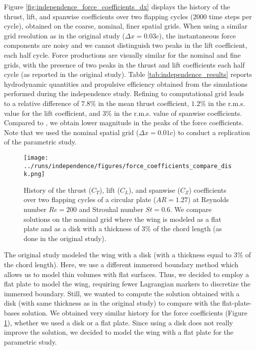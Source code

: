 Figure \ref{fig:independence_force_coefficients_dx} displays the history of the thrust, lift, and spanwise coefficients over two flapping cycles ($2000$ time steps per cycle), obtained on the coarse, nominal, finer spatial grids.
When using a similar grid resolution as in the original study ($\Delta x = 0.03c$), the instantaneous force components are noisy and we cannot distinguish two peaks in the lift coefficient, each half cycle.
Force productions are visually similar for the nominal and fine grids, with the presence of two peaks in the thrust and lift coefficients each half cycle (as reported in the original study).
Table \ref{tab:independence_results} reports hydrodynamic quantities and propulsive efficiency obtained from the simulations performed during the independence study.
Refining to computational grid leads to a relative difference of $7.8\%$ in the mean thrust coefficient, $1.2\%$ in the r.m.s. value for the lift coefficient, and $3\%$ in the r.m.s. value of spanwise coefficients.
Compared to \citet{li_dong_2016}, we obtain lower magnitude in the peaks of the force coefficients.
Note that we used the nominal spatial grid ($\Delta x = 0.01c$) to conduct a replication of the parametric study.

\begin{figure}
  \centering
  \texttt{[image: ../runs/independence/figures/force\_coefficients\_compare\_disk.png]}
  \caption{History of the thrust ($C_T$), lift ($C_L$), and spanwise ($C_Z$) coefficients over two flapping cycles of a circular plate ($AR = 1.27$) at Reynolds number $Re = 200$ and Strouhal number $St = 0.6$. We compare solutions on the nominal grid where the wing is modeled as a flat plate and as a disk with a thickness of $3\%$ of the chord length (as done in the original study\supercite{li_dong_2016}).}
  \label{fig:independence_force_coefficients_disk}
\end{figure}

The original study modeled the wing with a disk (with a thickness equal to $3\%$ of the chord length).
Here, we use a different immersed boundary method which allows us to model thin volumes with flat surfaces.
Thus, we decided to employ a flat plate to model the wing, requiring fewer Lagrangian markers to discretize the immersed boundary.
Still, we wanted to compute the solution obtained with a disk (with same thickness as in the original study) to compare with the flat-plate-bases solution.
We obtained very similar history for the force coefficients (Figure \ref{fig:independence_force_coefficients_disk}), whether we used a disk or a flat plate.
Since using a disk does not really improve the solution, we decided to model the wing with a flat plate for the parametric study.

